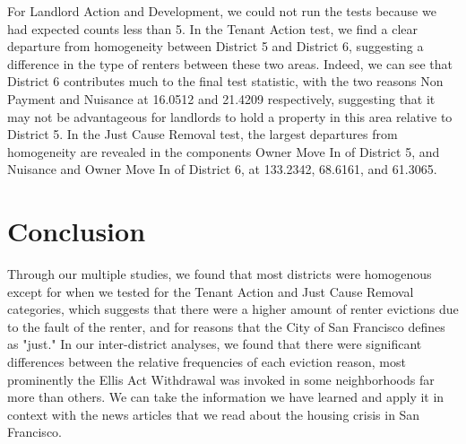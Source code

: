 \documentclass[]{article}
\begin{document}
For Landlord Action and Development, we could not run the tests because we had expected counts less than 5.
\newline\newline
In the Tenant Action test, we find a clear departure from homogeneity between District 5 and District 6, suggesting a difference in the type of renters between these two areas. Indeed, we can see that District 6 contributes much to the final test statistic, with the two reasons Non Payment and Nuisance at 16.0512 and 21.4209 respectively, suggesting that it may not be advantageous for landlords to hold a property in this area relative to District 5.
\newline\newline
In the Just Cause Removal test, the largest departures from homogeneity are revealed in the components Owner Move In of District 5, and Nuisance and Owner Move In of District 6, at 133.2342, 68.6161, and 61.3065.


\section{Conclusion}
Through our multiple studies, we found that most districts were homogenous except for when we tested for the Tenant Action and Just Cause Removal categories, which suggests that there were a higher amount of renter evictions due to the fault of the renter, and for reasons that the City of San Francisco defines as "just." In our inter-district analyses, we found that there were significant differences between the relative frequencies of each eviction reason, most prominently the Ellis Act Withdrawal was invoked in some neighborhoods far more than others. We can take the information we have learned and apply it in context with the news articles that we read about the housing crisis in San Francisco.

\newpage
\appendix
\end{document}
